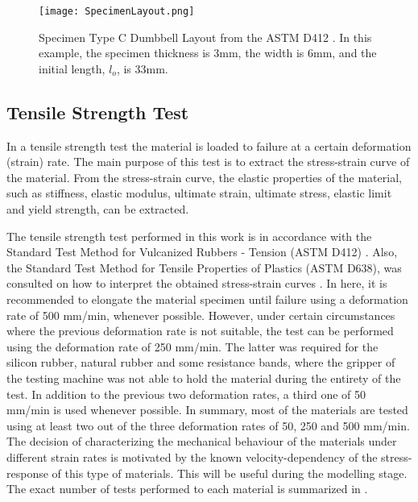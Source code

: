 \begin{figure}[htb!]
    \centering
    \texttt{[image: SpecimenLayout.png]}
    \caption[Specimen Type C Dumbbell Layout from the ASTM D412. In this example, the specimen thickness is 3mm, the width is 6mm, and the initial length, $l_o$, is 33mm.]{Specimen Type C Dumbbell Layout from the ASTM D412 \cite{astmd412}. In this example, the specimen thickness is 3mm, the width is 6mm, and the initial length, $l_o$, is 33mm.}
    \label{fig:specimenLayout}
\end{figure}

\subsection{Tensile Strength Test}

In a tensile strength test the material is loaded to failure at a certain deformation (strain) rate. The main purpose of this test is to extract the stress-strain curve of the material. From the stress-strain curve, the elastic properties of the material, such as stiffness, elastic modulus, ultimate strain, ultimate stress, elastic limit and yield strength, can be extracted. 

The tensile strength test performed in this work is in accordance with the Standard Test Method for Vulcanized Rubbers - Tension (ASTM D412) \cite{astmd412}. Also, the Standard Test Method for Tensile Properties of Plastics (ASTM D638), was consulted on how to interpret the obtained stress-strain curves \cite{astmd638}. In here, it is recommended to elongate the material specimen until failure using a deformation rate of 500 mm/min, whenever possible. However, under certain circumstances where the previous deformation rate is not suitable, the test can be performed using the deformation rate of 250 mm/min. The latter was required for the silicon rubber, natural rubber and some resistance bands, where the gripper of the testing machine was not able to hold the material during the entirety of the test. In addition to the previous two deformation rates, a third one of 50 mm/min is used whenever possible. In summary, most of the materials are tested using at least two out of the three deformation rates of 50, 250 and 500 mm/min. The decision of characterizing the mechanical behaviour of the materials under different strain rates is motivated by the known velocity-dependency of the stress-response of this type of materials. This will be useful during the modelling stage. The exact number of tests performed to each material is summarized in . 

